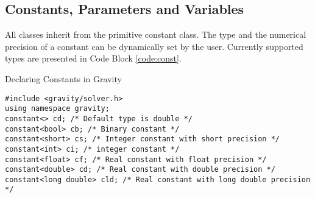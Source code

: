 \documentclass{article}
\newcommand{\Gravity}{{\sc Gravity}}
\begin{document}
\subsection{Constants, Parameters and Variables}
All classes inherit from the primitive constant class.
The type and the numerical precision of a constant can be dynamically set by the user.
Currently supported types are presented in Code Block \ref{code:const}.
\begin{code}[h!]
\caption{Declaring Constants in \Gravity{}}
\begin{verbatim}
#include <gravity/solver.h>
using namespace gravity;
constant<> cd; /* Default type is double */
constant<bool> cb; /* Binary constant */
constant<short> cs; /* Integer constant with short precision */
constant<int> ci; /* integer constant */
constant<float> cf; /* Real constant with float precision */
constant<double> cd; /* Real constant with double precision */
constant<long double> cld; /* Real constant with long double precision */
\end{verbatim}
\label{code:const}
\end{code}
\end{document}
